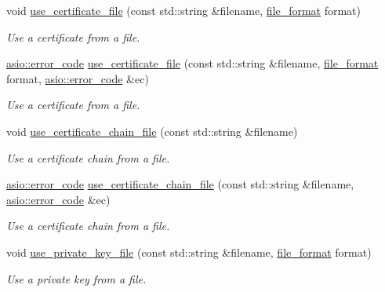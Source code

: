 \begin{DoxyCompactItemize}
void \hyperlink{classasio_1_1ssl_1_1old_1_1basic__context_a3775df7a83e057032c98942bb2a38d39}{use\+\_\+certificate\+\_\+file} (const std\+::string \&filename, \hyperlink{classasio_1_1ssl_1_1context__base_acc846aa73fffcab1fecad36dcf2be1fb}{file\+\_\+format} format)
\begin{DoxyCompactList}\small\item\em Use a certificate from a file. \end{DoxyCompactList}\item 
\hyperlink{classasio_1_1error__code}{asio\+::error\+\_\+code} \hyperlink{classasio_1_1ssl_1_1old_1_1basic__context_a4ef1780be8167a99c67b891549724667}{use\+\_\+certificate\+\_\+file} (const std\+::string \&filename, \hyperlink{classasio_1_1ssl_1_1context__base_acc846aa73fffcab1fecad36dcf2be1fb}{file\+\_\+format} format, \hyperlink{classasio_1_1error__code}{asio\+::error\+\_\+code} \&ec)
\begin{DoxyCompactList}\small\item\em Use a certificate from a file. \end{DoxyCompactList}\item 
void \hyperlink{classasio_1_1ssl_1_1old_1_1basic__context_a86400401e8cff30ac4a76c027cc419eb}{use\+\_\+certificate\+\_\+chain\+\_\+file} (const std\+::string \&filename)
\begin{DoxyCompactList}\small\item\em Use a certificate chain from a file. \end{DoxyCompactList}\item 
\hyperlink{classasio_1_1error__code}{asio\+::error\+\_\+code} \hyperlink{classasio_1_1ssl_1_1old_1_1basic__context_afe343f3341422d978a59bc3564d41035}{use\+\_\+certificate\+\_\+chain\+\_\+file} (const std\+::string \&filename, \hyperlink{classasio_1_1error__code}{asio\+::error\+\_\+code} \&ec)
\begin{DoxyCompactList}\small\item\em Use a certificate chain from a file. \end{DoxyCompactList}\item 
void \hyperlink{classasio_1_1ssl_1_1old_1_1basic__context_a88aa0b862bf2bcd4c714ec5335c4232d}{use\+\_\+private\+\_\+key\+\_\+file} (const std\+::string \&filename, \hyperlink{classasio_1_1ssl_1_1context__base_acc846aa73fffcab1fecad36dcf2be1fb}{file\+\_\+format} format)
\begin{DoxyCompactList}\small\item\em Use a private key from a file. \end{DoxyCompactList}\item 

\end{DoxyCompactItemize}
